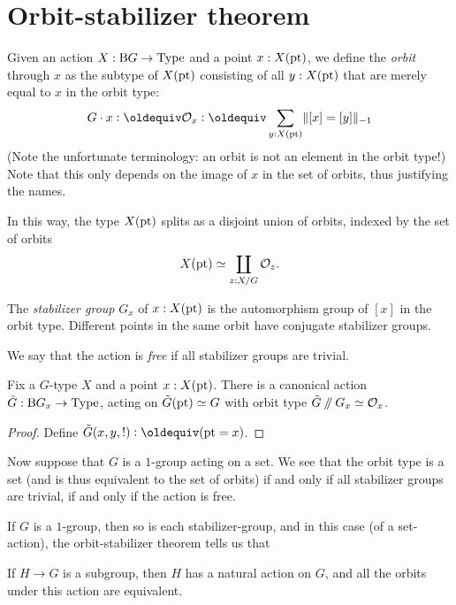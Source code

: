 \section{Orbit-stabilizer theorem}
\label{sec:orbit-stabilizer-theorem}

Given an action $X : \mathrm B G \to \mathord{\mathrm{Type}}$ and a point $x : X({\mathord{\mathrm{pt}}})$, we define
the \emph{orbit} through $x$ as the subtype of $X({\mathord{\mathrm{pt}}})$ consisting of
all $y : X({\mathord{\mathrm{pt}}})$ that are merely equal to $x$ in the orbit type:
\[
  G\cdot x \defeq \mathcal O_x \defeq \sum_{y : X(\pt)} \merely{[x] = [y]}
\]
(Note the unfortunate terminology: an orbit is not an element in the
orbit type!)
Note that this only depends on the image of $x$ in the set of orbits,
thus justifying the names.

In this way, the type $X({\mathord{\mathrm{pt}}})$ splits as a disjoint union of orbits,
indexed by the set of orbits
\[
  X({\mathord{\mathrm{pt}}}) \simeq \coprod_{z : X / G} \mathcal O_z.
\]

The \emph{stabilizer group} $G_x$ of $x : X({\mathord{\mathrm{pt}}})$ is the automorphism group of $[x]$ in the orbit type.
Different points in the same orbit have conjugate stabilizer groups.

We say that the action is \emph{free} if all stabilizer groups are trivial.

\begin{theorem}
  Fix a $G$-type $X$ and a point $x : X({\mathord{\mathrm{pt}}})$.
  There is a canonical action $\tilde G : \mathrm B G_x \to \mathord{\mathrm{Type}}$,
  acting on $\tilde G({\mathord{\mathrm{pt}}})\simeq G$
  with orbit type $\tilde G\mathbin{/\kern-3pt/} G_x \simeq \mathcal O_x$.
\end{theorem}
\begin{proof}
  Define $\tilde G(x,y,!) \defeq (\pt = x)$.
\end{proof}

Now suppose that $G$ is a $1$-group acting on a set.
We see that the orbit type is a set
(and is thus equivalent to the set of orbits)
if and only if
all stabilizer groups are trivial,
\ie if and only if the action is free.

If $G$ is a $1$-group,
then so is each stabilizer-group,
and in this case (of a set-action),
the orbit-stabilizer theorem
tells us that 

\begin{theorem}
  If $H \to G$ is a subgroup, then $H$ has a natural action on $G$,
  and all the orbits under this action are equivalent.
\end{theorem}


